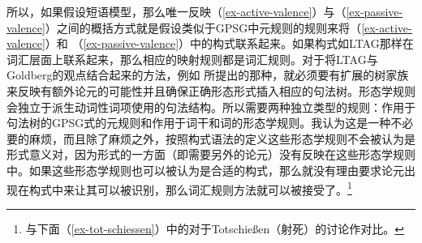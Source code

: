 \begin{exe}
\begin{xlist}[iv.]
\begin{exe}
\begin{xlist}[iv.]
所以，如果假设短语模型，那么唯一反映（\ref{ex-active-valence}）与（\ref{ex-passive-valence}）之间的概括方式就是假设类似于GPSG中元规则的规则来将（\ref{ex-active-valence}）和 （\ref{ex-passive-valence}）中的构式联系起来。如果构式如LTAG那样在词汇层面上联系起来，那么相应的映射规则都是词汇规则。对于将LTAG与Goldberg的观点结合起来的方法，例如 \citet{KO2012a}所提出的那种，就必须要有扩展的树家族来反映有额外论元的可能性并且确保正确形态形式插入相应的句法树。形态学规则会独立于派生动词性词项使用的句法结构。所以需要两种独立类型的规则：作用于句法树的GPSG式的元规则和作用于词干和词的形态学规则。我认为这是一种不必要的麻烦，而且除了麻烦之外，按照构式语法的定义这些形态学规则不会被认为是形式意义对，因为形式的一方面（即需要另外的论元）没有反映在这些形态学规则中。如果这些形态学规则也可以被认为是合适的构式，那么就没有理由要求论元出现在构式中来让其可以被识别，那么词汇规则方法就可以被接受了。\footnote{%
与下面（\ref{ex-tot-schiessen}）中的对于Totschießen（射死）的讨论作对比。%
}


\end{xlist}
\end{exe}
\end{xlist}
\end{exe}
